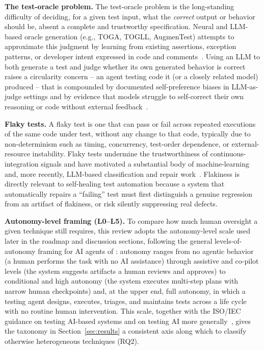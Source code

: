 \textbf{The test-oracle problem.} The test-oracle problem is the
long-standing difficulty of deciding, for a given test input, what the
\emph{correct} output or behavior should be, absent a complete and
trustworthy specification. Neural and LLM-based oracle generation
(e.g., TOGA, TOGLL, AugmenTest) attempts to approximate this judgment
by learning from existing assertions, exception patterns, or developer
intent expressed in code and
comments~\cite{dinella2022,o32024,o42025,bodicoat2026oracle,molina2024oracleautomation}.
Using an LLM to both generate a test and judge whether its own
generated behavior is correct raises a circularity concern -- an agent
testing code it (or a closely related model) produced -- that is
compounded by documented self-preference biases in LLM-as-judge
settings and by evidence that models struggle to self-correct their own
reasoning or code without external
feedback~\cite{wataoka2024selfpreference,panickssery2024evaluators,huang2023selfcorrect,olausson2023selfrepair}.

\textbf{Flaky tests.} A flaky test is one that can pass or fail across
repeated executions of the same code under test, without any change to
that code, typically due to non-determinism such as timing, concurrency,
test-order dependence, or external-resource instability. Flaky tests
undermine the trustworthiness of continuous-integration signals and
have motivated a substantial body of machine-learning and, more
recently, LLM-based classification and repair
work~\cite{fatima2025,alshammari2024flakyclassifiers,parry2023cannier,leinen2026detectedundetected,parry2025systemic,lam2020lifecycle,meta2020pfs}.
Flakiness is directly relevant to self-healing test automation because
a system that automatically repairs a ``failing'' test must first
distinguish a genuine regression from an artifact of flakiness, or risk
silently suppressing real defects.

\textbf{Autonomy-level framing (L0--L5).} To compare how much human
oversight a given technique still requires, this review adopts the
autonomy-level scale used later in the roadmap and discussion
sections, following the general levels-of-autonomy framing for AI
agents of \cite{feng2025autonomylevels}: autonomy ranges from no
agentic behavior (a human performs the task with no AI assistance)
through assistive and co-pilot levels (the system suggests artifacts a
human reviews and approves) to conditional and high autonomy (the
system executes multi-step plans with narrow human checkpoints) and,
at the upper end, full autonomy, in which a testing agent designs,
executes, triages, and maintains tests across a life cycle with no
routine human intervention. This scale, together with the ISO/IEC
guidance on testing AI-based systems and on testing AI more
generally~\cite{iso2020tr29119,iso2025ts42119}, gives the taxonomy in
Section~\ref{sec:results} a consistent axis along which to classify
otherwise heterogeneous techniques (RQ2).

